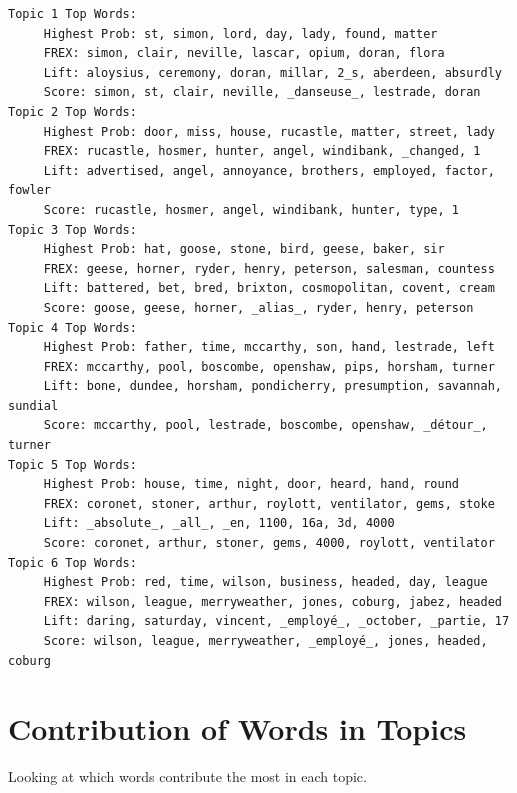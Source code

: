 \documentclass[
  letterpaper,
  DIV=11,
  numbers=noendperiod]{scrreprt}
\begin{document}
\begin{verbatim}
Topic 1 Top Words:
     Highest Prob: st, simon, lord, day, lady, found, matter 
     FREX: simon, clair, neville, lascar, opium, doran, flora 
     Lift: aloysius, ceremony, doran, millar, 2_s, aberdeen, absurdly 
     Score: simon, st, clair, neville, _danseuse_, lestrade, doran 
Topic 2 Top Words:
     Highest Prob: door, miss, house, rucastle, matter, street, lady 
     FREX: rucastle, hosmer, hunter, angel, windibank, _changed, 1 
     Lift: advertised, angel, annoyance, brothers, employed, factor, fowler 
     Score: rucastle, hosmer, angel, windibank, hunter, type, 1 
Topic 3 Top Words:
     Highest Prob: hat, goose, stone, bird, geese, baker, sir 
     FREX: geese, horner, ryder, henry, peterson, salesman, countess 
     Lift: battered, bet, bred, brixton, cosmopolitan, covent, cream 
     Score: goose, geese, horner, _alias_, ryder, henry, peterson 
Topic 4 Top Words:
     Highest Prob: father, time, mccarthy, son, hand, lestrade, left 
     FREX: mccarthy, pool, boscombe, openshaw, pips, horsham, turner 
     Lift: bone, dundee, horsham, pondicherry, presumption, savannah, sundial 
     Score: mccarthy, pool, lestrade, boscombe, openshaw, _détour_, turner 
Topic 5 Top Words:
     Highest Prob: house, time, night, door, heard, hand, round 
     FREX: coronet, stoner, arthur, roylott, ventilator, gems, stoke 
     Lift: _absolute_, _all_, _en, 1100, 16a, 3d, 4000 
     Score: coronet, arthur, stoner, gems, 4000, roylott, ventilator 
Topic 6 Top Words:
     Highest Prob: red, time, wilson, business, headed, day, league 
     FREX: wilson, league, merryweather, jones, coburg, jabez, headed 
     Lift: daring, saturday, vincent, _employé_, _october, _partie, 17 
     Score: wilson, league, merryweather, _employé_, jones, headed, coburg 
\end{verbatim}

\chapter{Contribution of Words in
Topics}\label{contribution-of-words-in-topics}

Looking at which words contribute the most in each topic.
\end{document}
